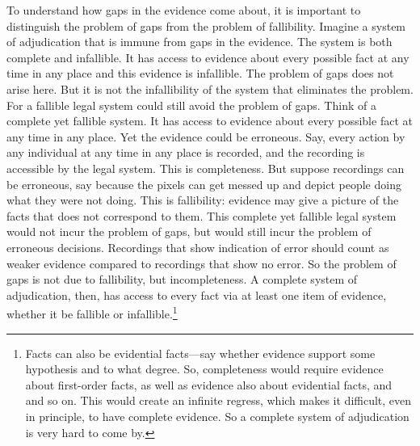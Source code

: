 \documentclass[
  10pt,
  dvipsnames,enabledeprecatedfontcommands]{scrartcl}
\begin{document}
To understand how gaps in the evidence come about, it is important to
distinguish the problem of gaps from the problem of fallibility. Imagine
a system of adjudication that is immune from gaps in the evidence. The
system is both complete and infallible. It has access to evidence about
every possible fact at any time in any place and this evidence is
infallible. The problem of gaps does not arise here. But it is not the
infallibility of the system that eliminates the problem. For a fallible
legal system could still avoid the problem of gaps. Think of a complete
yet fallible system. It has access to evidence about every possible fact
at any time in any place. Yet the evidence could be erroneous. Say,
every action by any individual at any time in any place is recorded, and
the recording is accessible by the legal system. This is completeness.
But suppose recordings can be erroneous, say because the pixels can get
messed up and depict people doing what they were not doing. This is
fallibility: evidence may give a picture of the facts that does not
correspond to them. This complete yet fallible legal system would not
incur the problem of gaps, but would still incur the problem of
erroneous decisions. Recordings that show indication of error should
count as weaker evidence compared to recordings that show no error. So
the problem of gaps is not due to fallibility, but incompleteness. A
complete system of adjudication, then, has access to every fact via at
least one item of evidence, whether it be fallible or
infallible.\footnote{Facts can also be evidential facts---say whether
  evidence support some hypothesis and to what degree. So, completeness
  would require evidence about first-order facts, as well as evidence
  also about evidential facts, and and so on. This would create an
  infinite regress, which makes it difficult, even in principle, to have
  complete evidence. So a complete system of adjudication is very hard
  to come by.}
\end{document}
